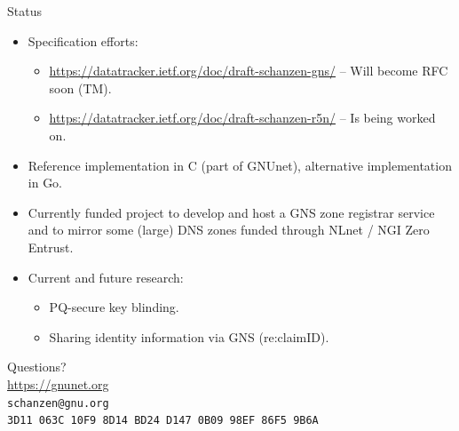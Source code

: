 \documentclass[aspectratio=169]{beamer}
\begin{document}
\begin{frame}{Status}
  \begin{itemize}
    \item Specification efforts:
      \begin{itemize}
        \item \url{https://datatracker.ietf.org/doc/draft-schanzen-gns/} -- Will become RFC soon (TM).
        \item \url{https://datatracker.ietf.org/doc/draft-schanzen-r5n/} -- Is being worked on.
      \end{itemize}
    \item Reference implementation in C (part of GNUnet), alternative implementation in Go.
    \item Currently funded project to develop and host a GNS zone registrar service and to mirror some (large) DNS zones funded through NLnet / NGI Zero Entrust.
    \item Current and future research:
      \begin{itemize}
        \item PQ-secure key blinding.
        \item Sharing identity information via GNS (re:claimID).
      \end{itemize}
  \end{itemize}
\end{frame}


\begin{frame}
  \begin{center}
    Questions?\\
    \vspace{2cm}
    \url{https://gnunet.org}\\
    \vspace{1em}
    {\tiny
    \texttt{schanzen@gnu.org}\\
    \texttt{3D11~063C~10F9~8D14~BD24~D147~0B09~98EF~86F5~9B6A}\\
    }
  \end{center}
\end{frame}
\end{document}
